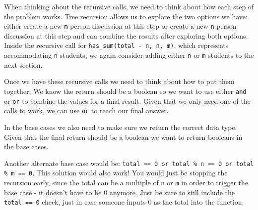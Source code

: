     \begin{solution}
    \begin{blocksection}
    When thinking about the recursive calls, we need to think about how each step of the problem works. Tree recursion allows us to explore the two options we have: 
    either create a new \lstinline{m}-person discussion at this step or create a new \lstinline{n}-person discussion at this step and can combine the results after exploring both options. 
    Inside the recursive call for \lstinline{has_sum(total - n, n, m)}, which represents accommodating \lstinline{n} students, we again consider adding either
    \lstinline{n} or \lstinline{m} students to the next section.
    
    Once we have these recursive calls we need to think about how to put them together. We know the return should be a boolean so we want to use either \lstinline{and} or \lstinline{or} to combine the values for a final result. Given that we only need one of the calls to work, we can use \lstinline{or} to reach our final answer.
    
    In the base cases we also need to make sure we return the correct data type. Given that the final return should be a boolean we want to return booleans in the base cases.
    
    Another alternate base case would be: \lstinline{total == 0 or total % n == 0 or total % m == 0}. This solution would also work! You would just be stopping the recursion early, since the total can be a multiple of \lstinline{n} or \lstinline{m} in order to trigger the base case - it doesn't have to be 0 anymore. Just be sure to still include the \lstinline{total == 0} check, just in case someone inputs 0 as the total into the function.
    \end{blocksection}
    \end{solution}
    
